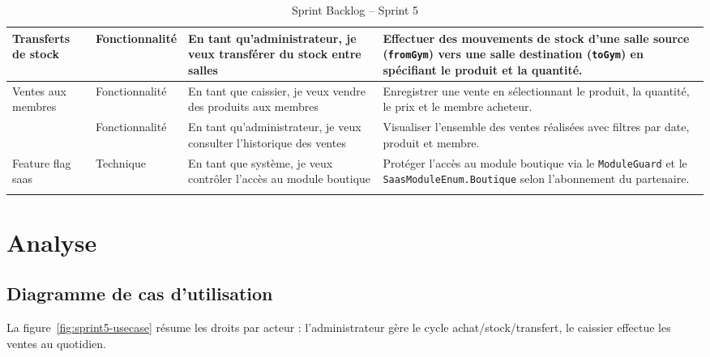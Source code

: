 ﻿\documentclass[../main.tex]{subfiles}
\begin{document}
\begin{longtable}{|p{2.3cm}|p{2.8cm}|p{3.7cm}|p{5.2cm}|}
\multirow{1}{*}{\parbox{2.5cm}{Transferts de stock}} & Fonctionnalit\'{e} & En tant qu'administrateur, je veux transf\'{e}rer du stock entre salles & Effectuer des mouvements de stock d'une salle source (\texttt{fromGym}) vers une salle destination (\texttt{toGym}) en sp\'{e}cifiant le produit et la quantit\'{e}. \\
\hline

\multirow{2}{*}{\parbox{2.5cm}{Ventes aux membres}} & Fonctionnalit\'{e} & En tant que caissier, je veux vendre des produits aux membres & Enregistrer une vente en s\'{e}lectionnant le produit, la quantit\'{e}, le prix et le membre acheteur. \\
\cline{2-4}
 & Fonctionnalit\'{e} & En tant qu'administrateur, je veux consulter l'historique des ventes & Visualiser l'ensemble des ventes r\'{e}alis\'{e}es avec filtres par date, produit et membre. \\
\hline

\multirow{1}{*}{\parbox{2.5cm}{Feature flag \acrshort{saas}}} & Technique & En tant que syst\`{e}me, je veux contr\^{o}ler l'acc\`{e}s au module boutique & Prot\'{e}ger l'acc\`{e}s au module boutique via le \texttt{ModuleGuard} et le \texttt{SaasModuleEnum.Boutique} selon l'abonnement du partenaire. \\
\hline
\caption{Sprint Backlog -- Sprint 5}
\label{tab:backlog_sprint5}
\end{longtable}

\section{Analyse}

\subsection{Diagramme de cas d'utilisation}

La figure~\ref{fig:sprint5-usecase} r\'{e}sume les droits par acteur : l'administrateur g\`{e}re le cycle achat/stock/transfert, le caissier effectue les ventes au quotidien.
\end{document}
